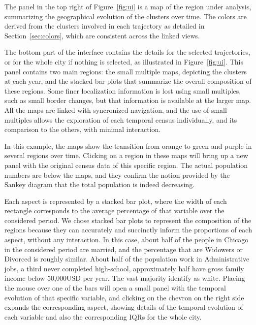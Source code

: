 The panel in the top right of Figure~\ref{fig:ui} is a map of the region under
analysis, summarizing the geographical evolution of the clusters over time.  The
colors are derived from the clusters involved in each trajectory as detailed in
Section~\ref{sec:colors}, which are consistent across the linked views. 

The bottom part of the interface contains the details for the selected
trajectories, or for the whole city if nothing is selected, as illustrated in
Figure~\ref{fig:ui}. This panel contains two main regions: the small multiple
maps, depicting the clusters at each year, and the stacked bar plots that
summarize the overall composition of these regions. Some finer localization
information is lost using small multiples, such as small border changes, but
that information is available at the larger map. All the maps are linked with
syncronized navigation, and the use of small multiples allows the exploration of
each temporal census individually, and its comparison to the others, with
minimal interaction. 

In this example, the maps show the transition from orange to green and purple in
several regions over time. Clicking on a region in these maps will bring up a
new panel with the original census data of this specific region. The actual
population numbers are below the maps, and they confirm the notion provided by
the Sankey diagram that the total population is indeed decreasing. 

Each aspect is represented by a stacked bar plot, where the width of each
rectangle corresponds to the average percentage of that variable over the
considered period. We chose stacked bar plots to represent the composition of
the regions because they can accurately and succinctly inform the proportions of
each aspect, without any interaction. In this case, about half of the people in
Chicago in the considered period are married, and the percentage that are
Widowers or Divorced is roughly similar. About half of the population work in
Administrative jobs, a third never completed high-school, approximately half
have gross family income below 50,000USD per year. The vast majority identify as
white. Placing the mouse over one of the bars will open a small panel with the
temporal evolution of that specific variable, and clicking on the chevron on the
right side expands the corresponding aspect, showing details of the temporal
evolution of each variable and also the corresponding IQRs for the whole city.